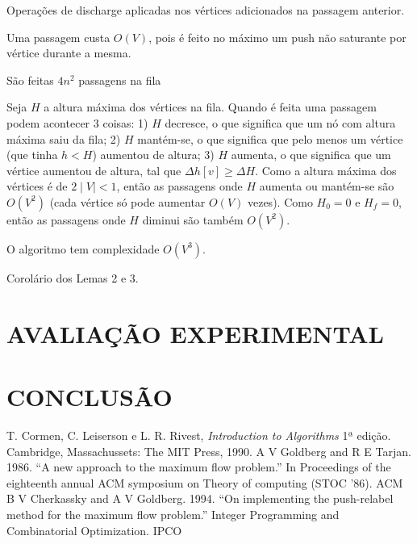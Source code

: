 \documentclass[a4paper, 12pt, conference, portuguese]{ieeeconf}
\begin{document}
\begin{defin} [Passagem]
  Operações de discharge aplicadas nos vértices adicionados na
  passagem anterior.
\end{defin}

\begin{lemma}
  Uma passagem custa $O(V)$, pois é feito no máximo um push não
  saturante por vértice durante a mesma.
\end{lemma}

\begin{lemma} São feitas $4n^2$ passagens na fila \end{lemma}

\begin{dem}
  Seja $H$ a altura máxima dos vértices na fila. Quando é feita
  uma passagem podem acontecer $3$ coisas: 1) $H$
  decresce, o que significa que um nó com altura máxima saiu da
  fila; 2) $H$ mantém-se, o que significa que pelo menos um
  vértice (que tinha $h < H$) aumentou de altura; 3) $H$ aumenta,
  o que significa que um vértice aumentou de altura, tal que
  $\Delta h[v] \geq \Delta H$. Como a altura máxima dos vértices
  é de $2 \mid V \mid < 1$, então as passagens onde $H$ aumenta
  ou mantém-se são $O(V^2)$ (cada vértice só pode aumentar $O(V)$
  vezes). Como $H_0 = 0$ e $H_f = 0$, então as passagens onde $H$
  diminui são também $O(V^2)$.
\end{dem}

\begin{theorem}
  O algoritmo tem complexidade $O(V^3)$.
\end{theorem}
\begin{dem}
  Corolário dos Lemas 2 e 3.
\end{dem}
\section{AVALIAÇÃO EXPERIMENTAL}\label{experimental}

\section{CONCLUSÃO}\label{conclusion}


\begin{thebibliography}{99}
   T. Cormen, C. Leiserson e L. R. Rivest, \textit{Introduction
    to Algorithms} 1ª edição. Cambridge, Massachussets: The MIT Press,
    1990.
    A V Goldberg and R E Tarjan. 1986.
    ``A new approach to the maximum flow problem.''
    In Proceedings of the eighteenth annual ACM symposium on Theory of computing (STOC '86). ACM
   B V Cherkassky and A V Goldberg. 1994.
    ``On implementing the push-relabel method for the maximum
    flow problem.'' Integer Programming and Combinatorial
    Optimization. IPCO
\end{thebibliography}
\end{document}
